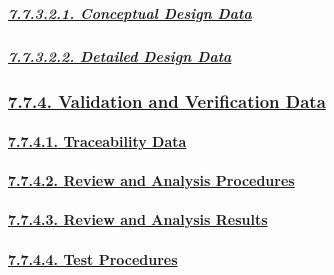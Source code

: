 \documentclass[
]{article}
\begin{document}
\hypertarget{conceptual-design-data}{%
\subparagraph{\texorpdfstring{\protect\hyperlink{conceptual-design-data-1}{7.7.3.2.1.
Conceptual Design
Data}}{7.7.3.2.1. Conceptual Design Data}}\label{conceptual-design-data}}

\hypertarget{detailed-design-data}{%
\subparagraph{\texorpdfstring{\protect\hyperlink{detailed-design-data-1}{7.7.3.2.2.
Detailed Design
Data}}{7.7.3.2.2. Detailed Design Data}}\label{detailed-design-data}}

\hypertarget{validation-and-verification-data}{%
\subsubsection{\texorpdfstring{\protect\hyperlink{validation-and-verification-data-1}{7.7.4.
Validation and Verification
Data}}{7.7.4. Validation and Verification Data}}\label{validation-and-verification-data}}

\hypertarget{traceability-data}{%
\paragraph{\texorpdfstring{\protect\hyperlink{traceability-data-1}{7.7.4.1.
Traceability
Data}}{7.7.4.1. Traceability Data}}\label{traceability-data}}

\hypertarget{review-and-analysis-procedures}{%
\paragraph{\texorpdfstring{\protect\hyperlink{review-and-analysis-procedures-1}{7.7.4.2.
Review and Analysis
Procedures}}{7.7.4.2. Review and Analysis Procedures}}\label{review-and-analysis-procedures}}

\hypertarget{review-and-analysis-results}{%
\paragraph{\texorpdfstring{\protect\hyperlink{review-and-analysis-results-1}{7.7.4.3.
Review and Analysis
Results}}{7.7.4.3. Review and Analysis Results}}\label{review-and-analysis-results}}

\hypertarget{test-procedures}{%
\paragraph{\texorpdfstring{\protect\hyperlink{test-procedures-1}{7.7.4.4.
Test Procedures}}{7.7.4.4. Test Procedures}}\label{test-procedures}}
\end{document}
